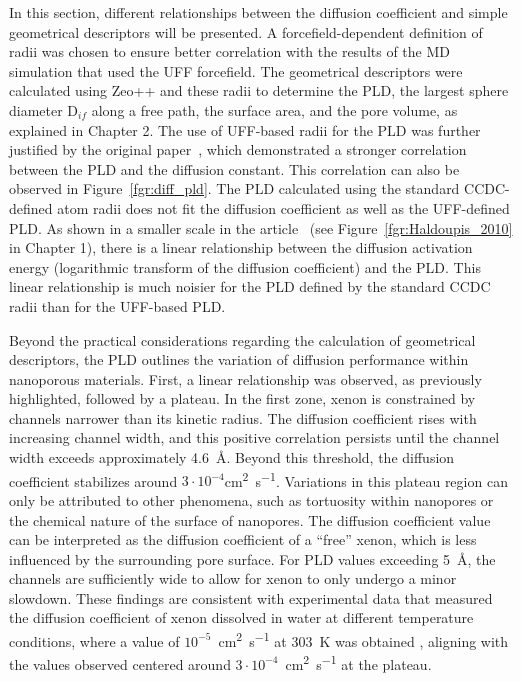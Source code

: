 \documentclass[main]{subfiles}
\begin{document}
In this section, different relationships between the diffusion coefficient and simple geometrical descriptors will be presented. A forcefield-dependent definition of radii was chosen to ensure better correlation with the results of the MD simulation that used the UFF forcefield. The geometrical descriptors were calculated using Zeo++ and these radii to determine the PLD, the largest sphere diameter D$_{if}$ along a free path, the surface area, and the pore volume, as explained in Chapter 2. The use of UFF-based radii for the PLD was further justified by the original paper~\cite{Hung_2021}, which demonstrated a stronger correlation between the PLD and the diffusion constant. This correlation can also be observed in Figure~\ref{fgr:diff_pld}. The PLD calculated using the standard CCDC-defined atom radii does not fit the diffusion coefficient as well as the UFF-defined PLD. As shown in a smaller scale in the article~\cite{Haldoupis_2010} (see Figure~\ref{fgr:Haldoupis_2010} in Chapter 1), there is a linear relationship between the diffusion activation energy (logarithmic transform of the diffusion coefficient) and the PLD. This linear relationship is much noisier for the PLD defined by the standard CCDC radii than for the UFF-based PLD.

Beyond the practical considerations regarding the calculation of geometrical descriptors, the PLD outlines the variation of diffusion performance within nanoporous materials. First, a linear relationship was observed, as previously highlighted, followed by a plateau. In the first zone, xenon is constrained by channels narrower than its kinetic radius. The diffusion coefficient rises with increasing channel width, and this positive correlation persists until the channel width exceeds approximately \SI{4.6}{\angstrom}. Beyond this threshold, the diffusion coefficient stabilizes around $3\cdot10^{-4}$\si{\square\cm\per\s}. Variations in this plateau region can only be attributed to other phenomena, such as tortuosity within nanopores or the chemical nature of the surface of nanopores. The diffusion coefficient value can be interpreted as the diffusion coefficient of a ``free'' xenon, which is less influenced by the surrounding pore surface. For PLD values exceeding \SI{5}{\angstrom}, the channels are sufficiently wide to allow for xenon to only undergo a minor slowdown. These findings are consistent with experimental data that measured the diffusion coefficient of xenon dissolved in water at different temperature conditions, where a value of $10^{-5}$~\si{\square\cm\per\s} at \SI{303}{\kelvin} was obtained \autocite{Wise1968}, aligning with the values observed centered around $3\cdot10^{-4}$~\si{\square\cm\per\s} at the plateau.
\end{document}

